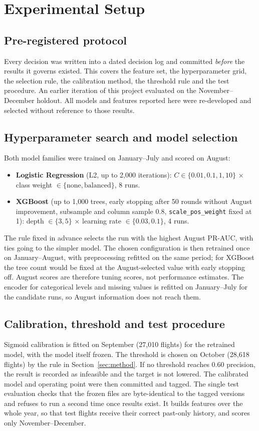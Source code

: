 \section{Experimental Setup}
\label{sec:experiments}

\subsection{Pre-registered protocol}
Every decision was written into a dated decision log and committed \emph{before} the results it
governs existed. This covers the feature set, the hyperparameter grid, the selection rule, the
calibration method, the threshold rule and the test procedure. An earlier iteration of this
project evaluated on the November--December holdout. All models and features reported here were
re-developed and selected without reference to those results.

\subsection{Hyperparameter search and model selection}
Both model families were trained on January--July and scored on August:
\begin{itemize}
  \item \textbf{Logistic Regression} (L2, up to 2{,}000 iterations): $C \in \{0.01, 0.1, 1, 10\}$
  $\times$ class weight $\in \{\text{none}, \text{balanced}\}$, 8 runs.
  \item \textbf{XGBoost} (up to 1{,}000 trees, early stopping after 50 rounds without August
  improvement, subsample and column sample 0.8, \texttt{scale\_pos\_weight} fixed at 1):
  depth $\in \{3, 5\}$ $\times$ learning rate $\in \{0.03, 0.1\}$, 4 runs.
\end{itemize}
The rule fixed in advance selects the run with the highest August PR-AUC, with ties going to the
simpler model. The chosen configuration is then retrained once on January--August, with
preprocessing refitted on the same period; for XGBoost the tree count would be fixed at the
August-selected value with early stopping off. August scores are therefore tuning scores, not
performance estimates. The encoder for categorical levels and missing values is refitted on
January--July for the candidate runs, so August information does not reach them.

\subsection{Calibration, threshold and test procedure}
Sigmoid calibration is fitted on September (27{,}010 flights) for the retrained model, with the
model itself frozen. The threshold is chosen on October (28{,}618 flights) by the rule in
Section~\ref{sec:method}. If no threshold reaches 0.60 precision, the result is recorded as
infeasible and the target is not lowered. The calibrated model and operating point were then
committed and tagged. The single test evaluation checks that the frozen files are byte-identical
to the tagged versions and refuses to run a second time once results exist. It builds features
over the whole year, so that test flights receive their correct past-only history, and scores
only November--December.


